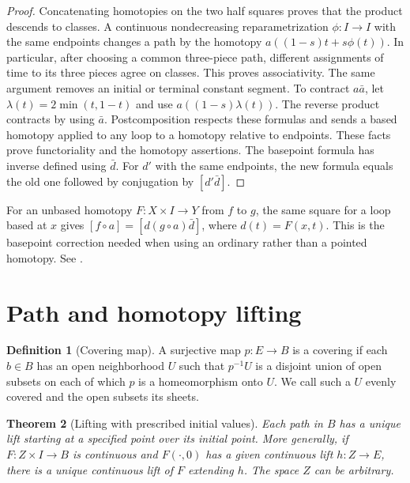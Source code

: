 \documentclass[11pt,oneside,openany]{book}
\theoremstyle{plain}
\newtheorem{theorem}{Theorem}[chapter]
\theoremstyle{definition}
\newtheorem{definition}[theorem]{Definition}
\theoremstyle{remark}
\begin{document}
\begin{proof}
Concatenating homotopies on the two half squares proves that
the product descends to classes. A continuous nondecreasing
reparametrization \(\phi:I\to I\) with the same endpoints
changes a path by the homotopy \(a((1-s)t+s\phi(t))\).
In particular, after choosing a common three-piece path,
different assignments of time to its three pieces agree on
classes. This proves associativity. The same argument removes
an initial or terminal constant segment. To contract \(a\bar
a\), let \(\lambda(t)=2\min(t,1-t)\) and use
\(a((1-s)\lambda(t))\). The reverse product contracts by using
\(\bar a\). Postcomposition respects these formulas and sends
a based homotopy applied to any loop to a homotopy relative to
endpoints. These facts prove functoriality and the homotopy
assertions. The basepoint formula has inverse defined using
\(\bar d\). For \(d'\) with the same endpoints, the new formula
equals the old one followed by conjugation by \([d'\bar d]\).
\end{proof}

For an unbased homotopy \(F:X\times I\to Y\) from \(f\) to \(g\),
the same square for a loop based at \(x\) gives
\([f\circ a]=[d(g\circ a)\bar d]\), where \(d(t)=F(x,t)\).
This is the basepoint correction needed when using an ordinary
rather than a pointed homotopy. See \cite[Sections 0 and 1.1]{Hatcher}.

\section{Path and homotopy lifting}\label{p202:T05}

\begin{definition}[Covering map]
A surjective map \(p:E\to B\) is a covering if each \(b\in B\)
has an open neighborhood \(U\) such that \(p^{-1}U\) is a disjoint
union of open subsets on each of which \(p\) is a homeomorphism
onto \(U\). We call such a \(U\) evenly covered and the open
subsets its sheets.
\end{definition}

\begin{theorem}[Lifting with prescribed initial values]
\label{thm:p202-cover-lifting}
Each path in \(B\) has a unique lift starting at a specified
point over its initial point. More generally, if
\(F:Z\times I\to B\) is continuous and \(F(\cdot,0)\) has a
given continuous lift \(h:Z\to E\), there is a unique
continuous lift of \(F\) extending \(h\). The space \(Z\)
can be arbitrary.
\end{theorem}
\end{document}
